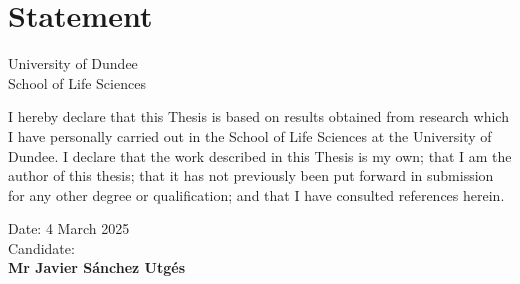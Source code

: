\chapter*{Statement}

\begin{center}
    \LARGE University of Dundee\\[1cm]
    \LARGE School of Life Sciences\\[2cm]
\end{center}

I hereby declare that this Thesis is based on results obtained from research which I have personally carried out in the School of Life Sciences at the University of Dundee. I declare that the work described in this Thesis is my own; that I am the author of this thesis; that it has not previously been put forward in submission for any other degree or qualification; and that I have consulted references herein.

\vfill

\begin{flushright}
    Date: 4 March 2025\\[1cm]
    Candidate:{\hspace{2cm}}
    \\[1cm]
    \textbf{Mr Javier Sánchez Utgés}
\end{flushright}